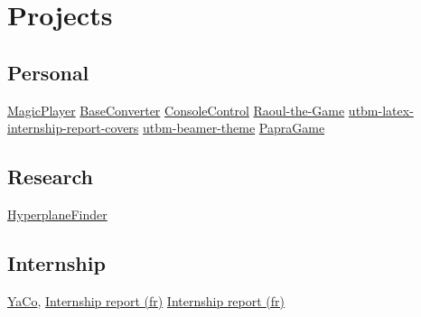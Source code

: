 \documentclass[letterpaper,10pt,sans]{moderncv}
\begin{document}

	\vspace*{\deletedSpace}
	\section{Projects}
		\subsection{Personal}
				{\href{https://github.com/pinam45/MagicPlayer}{MagicPlayer}}
				{\href{https://github.com/pinam45/BaseConverter}{BaseConverter}}
				{\href{https://github.com/pinam45/ConsoleControl}{ConsoleControl}}
				{\href{https://github.com/TiWinDeTea/Raoul-the-Game}{Raoul-the-Game}}
				{\href{https://github.com/pinam45/utbm-latex-internship-report-covers}{utbm-latex-internship-report-covers}}
				{\href{https://github.com/pinam45/utbm-beamer-theme}{utbm-beamer-theme}}
				{\href{https://github.com/TiWinDeTea/PapraGame}{PapraGame}}
		\subsection{Research}
				{\href{https://github.com/Lomadriel/HyperplaneFinder}{HyperplaneFinder}}
		\subsection{Internship}
				{\href{https://github.com/DGA-MI-SSI/YaCo}{YaCo}, \href{https://github.com/pinam45/UTBM_ST40_Rapport_de_stage_DGA}{Internship report (fr)}}
				{\href{https://github.com/pinam45/UTBM_ST40_Rapport_de_stage_DGA}{Internship report (fr)}}
\end{document}
